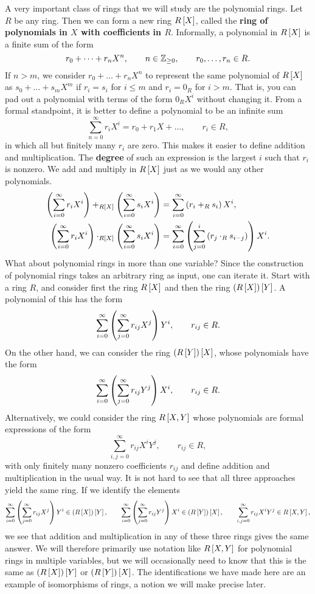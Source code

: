 A very important class of rings that we will study are the polynomial rings. Let $ R $ be any ring. Then we can form a new ring $ R\sb{X} $, called the \textbf{ring of polynomials in $ X $ with coefficients in $ R $}. Informally, a polynomial in $ R\sb{X} $ is a finite sum of the form
$$ r_0 + \dots + r_nX^n, \qquad n \in \Z_{\ge 0}, \qquad r_0, \dots, r_n \in R. $$
If $ n > m $, we consider $ r_0 + \dots + r_nX^n $ to represent the same polynomial of $ R\sb{X} $ as $ s_0 + \dots + s_mX^m $ if $ r_i = s_i $ for $ i \le m $ and $ r_i = 0_R $ for $ i > m $. That is, you can pad out a polynomial with terms of the form $ 0_RX^i $ without changing it. From a formal standpoint, it is better to define a polynomial to be an infinite sum
$$ \sum_{n = 0}^\infty r_iX^i = r_0 + r_1X + \dots, \qquad r_i \in R, $$
in which all but finitely many $ r_i $ are zero. This makes it easier to define addition and multiplication. The \textbf{degree} of such an expression is the largest $ i $ such that $ r_i $ is nonzero. We add and multiply in $ R\sb{X} $ just as we would any other polynomials.
\begin{align*}
\rb{\sum_{i = 0}^\infty r_iX^i} +_{R\sb{X}} \rb{\sum_{i = 0}^\infty s_iX^i} & = \sum_{i = 0}^\infty \rb{r_i +_R s_i} X^i, \\
\rb{\sum_{i = 0}^\infty r_iX^i} \cdot_{R\sb{X}} \rb{\sum_{i = 0}^\infty s_iX^i} & = \sum_{i = 0}^\infty \rb{\sum_{j = 0}^i \rb{r_j \cdot_R s_{i - j}}} X^i.
\end{align*}
What about polynomial rings in more than one variable? Since the construction of polynomial rings takes an arbitrary ring as input, one can iterate it. Start with a ring $ R $, and consider first the ring $ R\sb{X} $ and then the ring $ \rb{R\sb{X}}\sb{Y} $. A polynomial of this has the form
$$ \sum_{i = 0}^\infty \rb{\sum_{j = 0}^\infty r_{ij}X^j}Y^i, \qquad r_{ij} \in R. $$
On the other hand, we can consider the ring $ \rb{R\sb{Y}}\sb{X} $, whose polynomials have the form
$$ \sum_{i = 0}^\infty \rb{\sum_{j = 0}^\infty r_{ij}Y^j}X^i, \qquad r_{ij} \in R. $$
Alternatively, we could consider the ring $ R\sb{X, Y} $ whose polynomials are formal expressions of the form
$$ \sum_{i, j = 0}^\infty r_{ij}X^iY^j, \qquad r_{ij} \in R, $$
with only finitely many nonzero coefficients $ r_{ij} $ and define addition and multiplication in the usual way. It is not hard to see that all three approaches yield the same ring. If we identify the elements
$$ \sum_{i = 0}^\infty \rb{\sum_{j = 0}^\infty r_{ij}X^j}Y^i \in \rb{R\sb{X}}\sb{Y}, \qquad \sum_{i = 0}^\infty \rb{\sum_{j = 0}^\infty r_{ij}Y^j}X^i \in \rb{R\sb{Y}}\sb{X}, \qquad \sum_{i, j = 0}^\infty r_{ij}X^iY^j \in R\sb{X, Y}, $$
we see that addition and multiplication in any of these three rings gives the same answer. We will therefore primarily use notation like $ R\sb{X, Y} $ for polynomial rings in multiple variables, but we will occasionally need to know that this is the same as $ \rb{R\sb{X}}\sb{Y} $ or $ \rb{R\sb{Y}}\sb{X} $. The identifications we have made here are an example of isomorphisms of rings, a notion we will make precise later.

